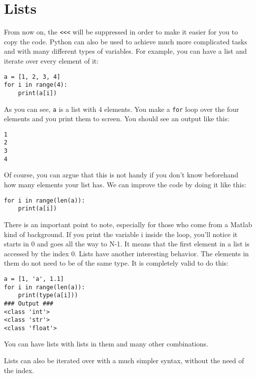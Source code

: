\section{Lists}\label{lists}
From now on, the \texttt{<<<}
will be suppressed in order to make it easier for you to copy the code.
Python can also be used to achieve much more complicated tasks and with
many different types of variables. For example, you can have a list and
iterate over every element of it:

\begin{verbatim}
a = [1, 2, 3, 4]
for i in range(4):
    print(a[i])
\end{verbatim}

As you can see, \texttt{a} is a list with 4 elements. You make a
\texttt{for} loop over the four elements and you print them to screen.
You should see an output like this:

\begin{verbatim}
1
2
3
4
\end{verbatim}

Of course, you can argue that this is not handy if you don't know
beforehand how many elements your list has. We can improve the code by
doing it like this:

\begin{verbatim}
for i in range(len(a)):
    print(a[i])
\end{verbatim}

There is an important point to note, especially for those who come from
a Matlab kind of background. If you print the variable i inside the
loop, you'll notice it starts in 0 and goes all the way to N-1. It means
that the first element in a list is accessed by the index 0. Lists have
another interesting behavior. The elements in them do not need to be of
the same type. It is completely valid to do this:

\begin{verbatim}
a = [1, 'a', 1.1]
for i in range(len(a)):
    print(type(a[i]))
### Output ###
<class 'int'>
<class 'str'>
<class 'float'>
\end{verbatim}

You can have lists with lists in them and many other combinations.


Lists can also be iterated over with a much simpler syntax, without the
need of the index.

